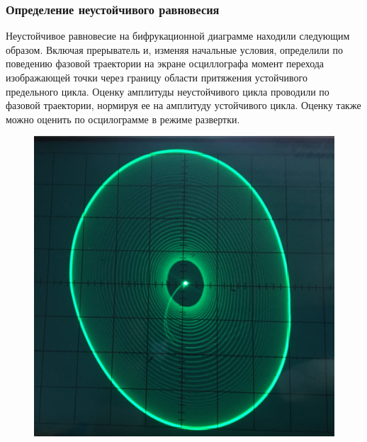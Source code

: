 \subsubsection{Определение неустойчивого равновесия}
Неустойчивое равновесие на бифрукационной диаграмме находили следующим образом. Включая прерыватель и, изменяя начальные условия, определили по поведению фазовой траектории на экране осциллографа момент перехода изображающей точки через границу области притяжения устойчивого предельного цикла. Оценку амплитуды неустойчивого цикла проводили по фазовой траектории, нормируя ее на амплитуду устойчивого цикла. Оценку также можно оценить по осцилограмме в режиме развертки.
\begin{figure}[h]
	\centering
	\begin{minipage}{0.32\linewidth}
	\includegraphics[width=\linewidth]{photo/task2b2.jpg}
	\end{minipage}
	\begin{minipage}{0.32\linewidth}

\end{minipage}
\end{figure}
